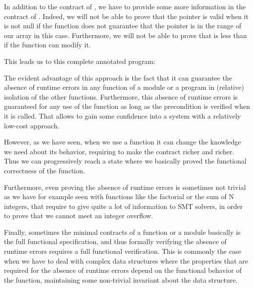 In addition to the contract of , we have to provide some more
information in the contract of . Indeed, we will not be able
to prove that the pointer is valid when it is not null if the function does not
guarantee that the pointer is in the range of our array in this case.
Furthermore, we will not be able to prove that  is less than
 if the function can modify it.


This leads us to this complete annotated program:






The evident advantage of this approach is the fact that it can guarantee the
absence of runtime errors in any function of a module or a program in (relative)
isolation of the other functions. Furthermore, this absence of runtime errors
is guaranteed for any use of the function as long as the precondition is
verified when it is called. That allows to gain some confidence into a system
with a relatively low-cost approach.



However, as we have seen, when we use a function it can change the knowledge
we need about its behavior, requiring to make the contract richer and richer.
Thus we can progressively reach a state where we basically proved the functional
correctness of the function.



Furthermore, even proving the absence of runtime errors is sometimes not trivial
as we have for example seen with functions like the factorial or the sum of
N integers, that require to give quite a lot of information to SMT solvers, in
order to prove that we cannot meet an integer overflow.



Finally, sometimes the minimal contracts of a function or a module basically
is the full functional specification, and thus formally verifying the absence
of runtime errors requires a full functional verification. This is commonly the
case when we have to deal with complex data structures where the properties
that are required for the absence of runtime errors depend on the functional
behavior of the function, maintaining some non-trivial invariant about the
data structure.







